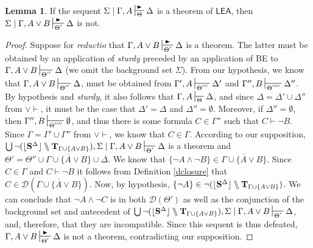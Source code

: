 \documentclass{article}
\theoremstyle{definition}
\theoremstyle{definition}
\theoremstyle{definition}
\newtheorem{lemma}{Lemma}
\theoremstyle{definition}
\theoremstyle{remark}
\theoremstyle{definition}
\theoremstyle{definition}
\begin{document}
\begin{lemma}\label{lem:disjmin1}
	If the sequent $ \Sigma\mid \Gamma, A \sststile{\Theta}{\RHD} \Delta $ is a theorem of $ \mathsf{LEA}$, then $ \Sigma\mid \Gamma, A\vee B \sststile{\Theta'}{\RHD} \Delta $ is not.
	
	\begin{proof}
		Suppose for \textit{reductio} that $ \Gamma, A\vee B \sststile{\Theta'}{\RHD} \Delta $ is a theorem. The latter must be obtained by an application of \textit{sturdy} preceded by an application of \textsf{BE} to $ \Gamma, A\vee B \sststile{\Theta''}{} \Delta  $ (we omit the background set $ \Sigma $). From our hypothesis, we know that $ \Gamma, A\vee B \sststile{\Theta''}{} \Delta  $, must be obtained from $ \Gamma', A\sststile{\Theta'''}{} \Delta'  $ and $ \Gamma'', B\sststile{\Theta''''}{} \Delta''  $. By hypothesis and \textit{sturdy}, it also follows that $ \Gamma, A \sststile{\Theta}{} \Delta$, and since  $ \Delta =\Delta'\cup\Delta'' $ from $ \vee\vdash $, it must be the case that  $ \Delta'=\Delta $ and $ \Delta''=\emptyset $. Moreover, if $ \Delta''=\emptyset $, then $ \Gamma'', B\sststile{\Theta''''}{}  \emptyset$, and thus there is some formula $ C \in \Gamma'' $ such that $ C\vdash \neg B $. Since $ \Gamma=\Gamma'\cup\Gamma'' $ from $ \vee\vdash $, we  know that $ C \in \Gamma$.   According to our supposition, $ \bigcup\neg(\lfloor\mathbf{S}^\Delta\rfloor\bbslash\mathbf{T}_{\Gamma\cup\{A\vee B\}}), \Sigma\mid\Gamma, A\vee B \sststile{\Theta'}{} \Delta $ is a theorem and $ \Theta' = \Theta''\cup\overline{\Gamma\cup\{A\vee B\}}  \cup\Delta $. We know that $ \{\neg A \wedge \neg B\} \in  \overline{\Gamma\cup\{A\vee B\}} $. Since $ C \in \Gamma $ and $ C \vdash \neg B $ it follows from Definition \ref{dclosure} that $ C \in \mathcal{D}(\overline{\Gamma\cup\{A\vee B\}}) $. Now, by hypothesis, $ \{\neg A\}\in\neg (\lfloor\mathbf{S}^\Delta\rfloor\bbslash\mathbf{T}_{\Gamma\cup\{A\vee B\}}) $. We can  conclude that $ \neg A \wedge \neg C $ is in both $ \mathcal{D}(\Theta') $ as well as the conjunction of the background set and antecedent of $ \bigcup\neg(\lfloor\mathbf{S}^\Delta\rfloor\bbslash\mathbf{T}_{\Gamma\cup\{A\vee B\}}), \Sigma\mid\Gamma, A\vee B \sststile{\Theta'}{} \Delta $, and, therefore, that they are incompatible. Since this sequent is thus defeated, $ \Gamma, A\vee B \sststile{\Theta'}{\RHD} \Delta $ is not a theorem, contradicting our supposition.
	\end{proof}
\end{lemma}
\end{document}
